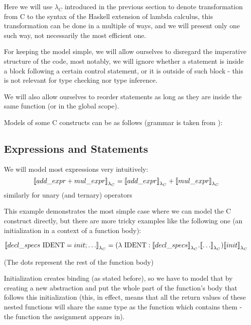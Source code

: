 Here we will use $\lambda_C$ introduced in the previous section to denote transformation from C to the syntax of the Haskell extension of lambda calculus, this transformation can be done in a multiple of ways, and we will present only one such way, not necessarily the most efficient one.

For keeping the model simple, we will allow ourselves to disregard the imperative structure of the code, most notably, we will ignore whether a statement is inside a block following a certain control statement, or it is outside of such block - this is not relevant for type checking nor type inference.

We will also allow ourselves to reorder statements as long as they are inside the same function (or in the global scope).

Models of some C constructs can be as follows (grammar is taken from \cite{organisation1999iso}):

\subsection{Expressions and Statements}
\label{ssec:exprStat}

\begin{defn}
    We will model most expressions very intuitively:
    $${\llbracket add\_expr + mul\_expr \rrbracket}_{\lambda_C} = {\llbracket add\_expr \rrbracket}_{\lambda_C} + {\llbracket mul\_expr \rrbracket}_{\lambda_C}$$
    similarly for unary (and ternary) operators
\end{defn}


This example demonstrates the most simple case where we can model the C construct directly, but there are more tricky examples like the following one (an initialization in a context of a function body):

\begin{defn}
    $${\llbracket decl\_specs\ \text{IDENT} = init; \dots \rrbracket}_{\lambda_C} = (\lambda\ \text{IDENT} : {\llbracket decl\_specs \rrbracket}_{\lambda_C} . {\llbracket \dots \rrbracket}_{\lambda_C}) {\llbracket init \rrbracket}_{\lambda_C}$$
\end{defn}

(The dots represent the rest of the function body)

Initialization creates binding (as stated before), so we have to model that by creating a new abstraction and put the whole part of the function's body that follows this initialization (this, in effect, means that all the return values of these nested functions will share the same type as the function which contains them - the function the assignment appears in).

